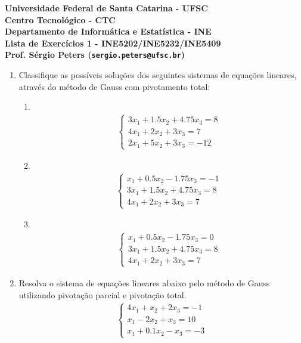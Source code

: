 \documentclass[12pt]{article}
\newenvironment{smallitem}{
    \vspace{-2mm}
    \begin{enumerate}
    \setlength{\parskip}{0pt}
    \setlength{\itemsep}{2pt}
}{
    \vspace{-2mm}
    \end{enumerate}
}
\newcommand\Item[1][]{
    #1 \item
    \abovedisplayskip=0pt
    ~\vspace*{-\baselineskip}
}
\begin{document}
{\bf \noindent Universidade Federal de Santa Catarina - UFSC \\
Centro Tecnológico - CTC \\
Departamento de Informática e Estatística - INE \\

\noindent Lista de Exercícios 1 - INE5202/INE5232/INE5409 \\
Prof. Sérgio Peters (\texttt{sergio.peters@ufsc.br})}

\begin{enumerate}[label=\textbf{\arabic*})]

\item Classifique as possíveis soluções dos seguintes sistemas de equações
lineares, através do método de Gauss com pivotamento total:

\begin{smallitem}

\Item \begin{align*}
\begin{cases}
3 x_1 + 1.5 x_2 + 4.75 x_3 = 8 \\
4 x_1 + 2 x_2 + 3 x_3 = 7 \\
2 x_1 + 5 x_2 + 3 x_3 = -12
\end{cases}
\end{align*}

\Item \begin{align*}
\begin{cases}
x_1 + 0.5 x_2 - 1.75 x_3 = -1 \\
3 x_1 + 1.5 x_2 + 4.75 x_3 = 8 \\
4 x_1 + 2 x_2 + 3 x_3 = 7
\end{cases}
\end{align*}

\Item \begin{align*}
\begin{cases}
x_1 + 0.5 x_2 - 1.75 x_3 = 0 \\
3 x_1 + 1.5 x_2 + 4.75 x_3 = 8 \\
4 x_1 + 2 x_2 + 3 x_3 = 7
\end{cases}
\end{align*}

\end{smallitem}

\item Resolva o sistema de equações lineares abaixo pelo método de Gauss
utilizando pivotação parcial e pivotação total.
\begin{align*}
\begin{cases}
4 x_1 + x_2 + 2 x_3 = -1 \\
x_1 - 2 x_2 + x_3 = 10 \\
x_1 + 0.1 x_2 - x_3 = -3
\end{cases}
\end{align*}


\end{enumerate}
\end{document}
